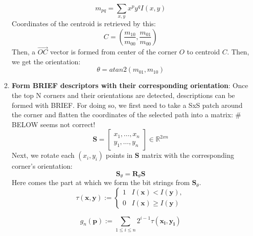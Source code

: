 \documentclass[a4paper]{report}
\numberwithin{figure}{section}
\newcommand{\R}{\mathbb{R}}
\begin{document}
\begin{enumerate}
    \begin{equation}
      m_{pq} = \sum_{x,y} x^p y^q I(x,y)
    \end{equation}
    Coordinates of the centroid is retrieved by this:
    \begin{equation}
      C = (\frac{m_{10}}{m_{00}}, \frac{m_{01}}{m_{00}})
    \end{equation}
    Then, a $\overrightarrow{OC} $ vector is formed from 
    center of the corner $O$ to centroid $C$. Then, we get the orientation:
    \begin{equation}
      \theta = atan2(m_{01}, m_{10})
    \end{equation}

  \item \textbf{Form BRIEF descriptors with their corresponding orientation}:
    Once the top N corners and their orientations are detected, descriptions 
    can be formed with BRIEF. For doing so, we first need to take a SxS patch around 
    the corner and flatten the coordinates of the selected path into a matrix:
    \# BELOW seems not correct!
    \begin{equation}
      \mathbf{S} = 
      \begin{bmatrix}
      x_1, \dots, x_n\\
      y_1, \dots, y_n
      \end{bmatrix} \in \R^{2xn}
    \end{equation}
    Next, we rotate each $(x_i,y_i)$ points in $\mathbf{S}$ matrix with the 
    corresponding corner's orientation:
    \begin{equation}
      \mathbf{S}_{\theta} = \mathbf{R}_{\theta}\mathbf{S}
    \end{equation}
    Here comes the part at which we form the bit strings from 
    $\mathbf{S}_{\theta}$. 
    \begin{equation*}
      \tau(\mathbf{x},\mathbf{y}) := 
      \begin{cases}
        1  & I(\mathbf{x}) < I(\mathbf{y}),\\
        0  & I(\mathbf{x}) \geq I(\mathbf{y})
      \end{cases}
    \end{equation*}

    \begin{equation}
      g_n(\mathbf{p}) := \sum_{1\leq i \leq n} 2^{i-1}\tau (\mathbf{x_i, y_i})
    \end{equation}

\end{enumerate}
\end{document}
